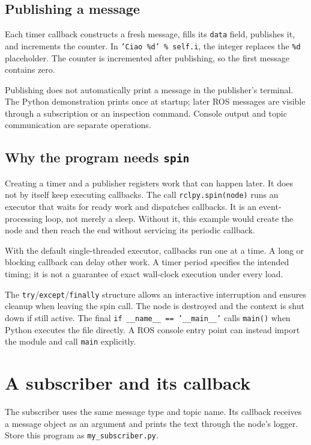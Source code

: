 \subsection{Publishing a message}
Each timer callback constructs a fresh message, fills its \texttt{data}
field, publishes it, and increments the counter. In
\texttt{'Ciao \%d' \% self.i}, the integer replaces the \texttt{\%d}
placeholder. The counter is incremented after publishing, so the first
message contains zero.

Publishing does not automatically print a message in the publisher's
terminal. The Python demonstration prints once at startup; later ROS
messages are visible through a subscription or an inspection command.
Console output and topic communication are separate operations.

\subsection{Why the program needs \texttt{spin}}
Creating a timer and a publisher registers work that can happen later.
It does not by itself keep executing callbacks. The call
\texttt{rclpy.spin(node)} runs an executor that waits for ready work and
dispatches callbacks. It is an event-processing loop, not merely a sleep.
Without it, this example would create the node and then reach the end
without servicing its periodic callback.

With the default single-threaded executor, callbacks run one at a time.
A long or blocking callback can delay other work. A timer period specifies
the intended timing; it is not a guarantee of exact wall-clock execution
under every load.

The \texttt{try}/\texttt{except}/\texttt{finally} structure allows an
interactive interruption and ensures cleanup when leaving the spin call.
The node is destroyed and the context is shut down if still active.
The final \texttt{if \_\_name\_\_ == '\_\_main\_\_'} calls
\texttt{main()} when Python executes the file directly. A ROS console
entry point can instead import the module and call \texttt{main} explicitly.

\section{A subscriber and its callback}
\label{sec:l14-subscriber}
The subscriber uses the same message type and topic name. Its callback
receives a message object as an argument and prints the text through the
node's logger. Store this program as \texttt{my\_subscriber.py}.

